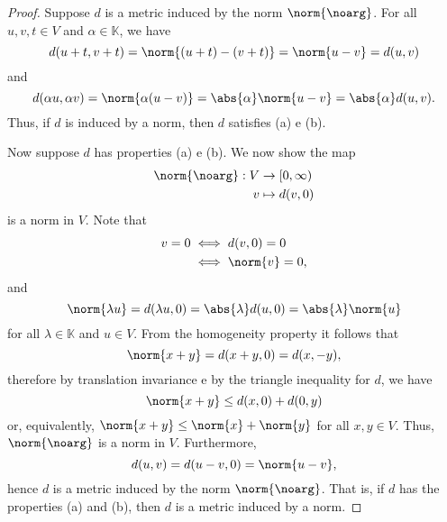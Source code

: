 \begin{proof}
    Suppose \(d\) is a metric induced by the norm \(\norm{\noarg}\). For all \(u,v,t\in V\) and \(\alpha \in \mathbb{K}\), we have
    \begin{equation*}
        d(u + t, v + t) = \norm{(u+t) - (v + t)} = \norm{u - v} = d(u,v)
    \end{equation*}
    and
    \begin{equation*}
        d(\alpha u, \alpha v) = \norm{\alpha (u - v)} = \abs{\alpha} \norm{u-v} = \abs{\alpha} d(u,v).
    \end{equation*}
    Thus, if \(d\) is induced by a norm, then \(d\) satisfies (a) e (b).

    Now suppose \(d\) has properties (a) e (b). We now show the map
    \begin{align*}
        \norm{\noarg} : V &\to [0, \infty)\\
                                 v &\mapsto d(v, 0)
    \end{align*}
    is a norm in \(V\). Note that
    \begin{align*}
        v = 0 &\iff d(v, 0) = 0\\
              &\iff \norm{v} = 0,
    \end{align*}
    and
    \begin{equation*}
        \norm{\lambda u} = d(\lambda u, 0) = \abs{\lambda} d(u,0) = \abs{\lambda}\norm{u}
    \end{equation*}
    for all \(\lambda \in \mathbb{K}\) and \(u \in V\). From the homogeneity property it follows that
    \begin{equation*}
        \norm{x + y} = d(x + y, 0) = d(x, -y),
    \end{equation*}
    therefore by translation invariance e by the triangle inequality for \(d\), we have
    \begin{equation*}
        \norm{x+y} \leq d(x, 0) + d(0, y)
    \end{equation*}
    or, equivalently, \(\norm{x+y} \leq \norm{x} + \norm{y}\) for all \(x,y\in V\). Thus, \(\norm{\noarg}\) is a norm in \(V\). Furthermore,
    \begin{equation*}
        d(u, v) = d(u-v, 0) = \norm{u - v},
    \end{equation*}
    hence \(d\) is a metric induced by the norm \(\norm{\noarg}\). That is, if \(d\) has the properties (a) and (b), then \(d\) is a metric induced by a norm.
\end{proof}

